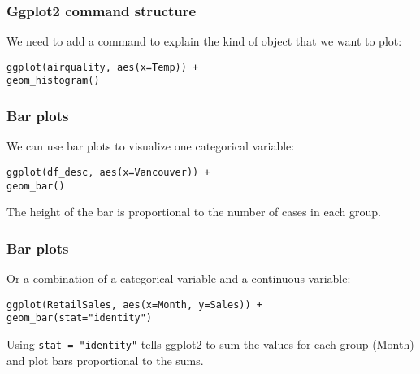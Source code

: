 \documentclass{beamer}
\begin{document}
	\begin{frame}[fragile]
		\frametitle{Ggplot2 command structure}

		We need to add a command to explain the kind of object that we want to plot:

		\vspace{2em}

		\begin{exampleblock}{}
		\begin{BVerbatim}
ggplot(airquality, aes(x=Temp)) +
geom_histogram()
		\end{BVerbatim}
		\end{exampleblock}{}
		
	\end{frame}

	\begin{frame}[fragile]
		\frametitle{Bar plots}

		We can use bar plots to visualize one categorical variable:

		\vspace{2em}

		\begin{exampleblock}{}
		\begin{BVerbatim}
ggplot(df_desc, aes(x=Vancouver)) +
geom_bar()
		\end{BVerbatim}
		\end{exampleblock}{}

		\vspace{2em}

		The height of the bar is proportional to the number of cases in each group.
		
	\end{frame}

	\begin{frame}[fragile]
		\frametitle{Bar plots}

		Or a combination of a categorical variable and a continuous variable:

		\vspace{2em}

		\begin{exampleblock}{}
		\begin{BVerbatim}
ggplot(RetailSales, aes(x=Month, y=Sales)) + 
geom_bar(stat="identity")
		\end{BVerbatim}
		\end{exampleblock}{}

		\vspace{2em}

		Using \verb|stat = "identity"| tells ggplot2 to sum the values for each group (Month) and plot bars proportional to the sums.
		
	\end{frame}
\end{document}
